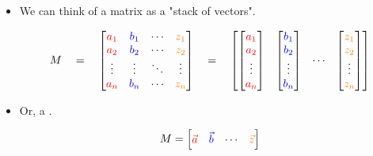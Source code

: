         \begin{itemize}
            \item We can think of a matrix as a "stack of vectors".

            \begin{equation}
                M \quad=\quad 
                \begin{bmatrix}
                    \textcolor{red}{a_1} & \textcolor{blue}{b_1} & \cdots & \textcolor{orange}{z_1} \\
                    \textcolor{red}{a_2} & \textcolor{blue}{b_2} & \cdots & \textcolor{orange}{z_2} \\
                    \vdots & \vdots & \ddots & \vdots \\
                    \textcolor{red}{a_n} & \textcolor{blue}{b_n} & \cdots & \textcolor{orange}{z_n}
                \end{bmatrix}
                \quad=\quad
                \begin{bmatrix}
                    \begin{bmatrix}
                        \textcolor{red}{a_1} \\
                        \textcolor{red}{a_2} \\
                        \vdots \\
                        \textcolor{red}{a_n} 
                    \end{bmatrix}
                    &
                    \begin{bmatrix}
                        \textcolor{blue}{b_1} \\
                        \textcolor{blue}{b_2} \\
                        \vdots \\
                        \textcolor{blue}{b_n} 
                    \end{bmatrix}
                    & 
                    \cdots 
                    &
                    \begin{bmatrix}
                        \textcolor{orange}{z_1} \\
                        \textcolor{orange}{z_2} \\
                        \vdots \\
                        \textcolor{orange}{z_n} 
                    \end{bmatrix}
                \end{bmatrix}
            \end{equation}
            
            \item Or, a .

            \begin{equation}
                M =
                \begin{bmatrix}
                    \textcolor{red}{\vec{a}} & \textcolor{blue}{\vec{b}} & \cdots & \textcolor{orange}{\vec{z}}
                \end{bmatrix}
            \end{equation}
        \end{itemize}

